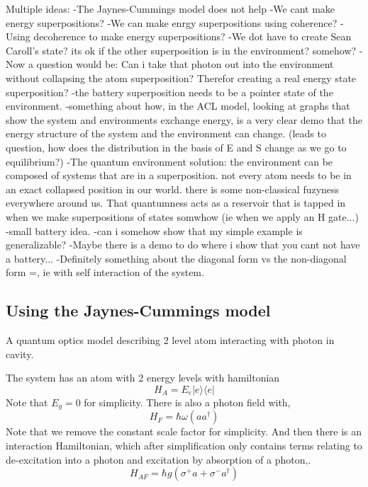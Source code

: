 \documentclass{article}
\begin{document}
Multiple ideas: 
-The Jaynes-Cummings model does not help
-We cant make energy superpositions?
-We can make enrgy superpositions using coherence? 
-Using decoherence to make energy superpositions?
-We dot have to create Sean Caroll's state? its ok if the other superposition is in the environment? somehow? -Now a question would be: Can i take that photon out into the environment without collapsing the atom superposition? Therefor creating a real energy state superposition? 
-the battery superposition needs to be a pointer state of the environment.
-something about how, in the ACL model, looking at graphs that show the system and environments exchange energy, is a very clear demo that the energy structure of the system and the environment can change. (leads to question, how does the distribution in the basis of E and S change as we go to equilibrium?)
-The quantum environment solution: the environment can be composed of systems that are in a superposition. not every atom needs to be in an exact collapsed position in our world. there is some non-classical fuzyness everywhere around us. That quantumness acts as a reservoir that is tapped in when we make superpositions of states somwhow (ie when we apply an H gate...)
-small battery idea.
-can i somehow show that my simple example is generalizable? 
-Maybe there is a demo to do where i show that you cant not have a battery...
-Definitely something about the diagonal form vs the non-diagonal form =, ie with self interaction of the system.

\subsection{Using the Jaynes-Cummings model}
A quantum optics model describing 2 level atom interacting with photon in cavity.

The system has an atom with 2 energy levels with hamiltonian 
\begin{equation}
    H_A=E_e|e\rangle\langle e|
\end{equation}
Note that $E_g=0$ for simplicity.
There is also a photon field with, 
\begin{equation}
    H_F=\hbar\omega(aa^{\dagger})
\end{equation}
Note that we remove the constant scale factor for simplicity.
And then there is an interaction Hamiltonian, which after simplification only contains terms relating to de-excitation into a photon and excitation by absorption of a photon,.
\begin{equation}
    H_{AF}=\hbar g(\sigma^{+}a+\sigma^-a^{\dagger})
\end{equation}
\end{document}
